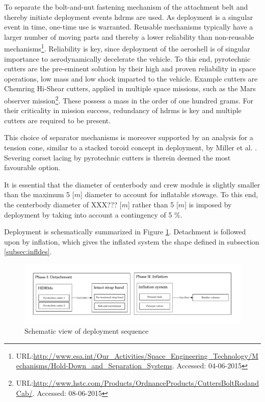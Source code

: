 To separate the bolt-and-nut fastening mechanism of the attachment belt and thereby initiate deployment events \glspl{hdrm} are used. As deployment is a singular event in time, one-time use is warranted. Reusable mechanisms typically have a larger number of moving parts and thereby a lower reliability than non-reusable mechanisms\footnote{URL:\url{http://www.esa.int/Our_Activities/Space_Engineering_Technology/Mechanisms/Hold-Down_and_Separation_Systems}. Accessed: 04-06-2015}. Reliability is key, since deployment of the aeroshell is of singular importance to aerodynamically decelerate the vehicle. To this end, pyrotechnic cutters are the pre-eminent solution by their high and proven reliability in space operations, low mass and low shock imparted to the vehicle. Example cutters are Chemring Hi-Shear cutters, applied in multiple space missions, such as the Mars observer mission\footnote{URL:\url{http://www.hstc.com/Products/OrdnanceProducts/CuttersBoltRodandCab/}. Accessed: 08-06-2015}. These possess a mass in the order of one hundred grams. For their criticality in mission success, redundancy of \glspl{hdrm} is key and multiple cutters are required to be present. 

This choice of separator mechanisms is moreover supported by an analysis for a tension cone, similar to a stacked toroid concept in deployment, by Miller et al. \cite{Miller2014}. Severing corset lacing by pyrotechnic cutters is therein deemed the most favourable option.

It is essential that the diameter of centerbody and crew module is slightly smaller than the maximum 5 [$m$] diameter to account for inflatable stowage. To this end, the centerbody diameter of XXX??? [$m$] rather than 5 [$m$] is imposed by deployment by taking into account a contingency of 5 $\%$.

Deployment is schematically summarized in Figure \ref{fig:deplflow}. Detachment is followed upon by inflation, which gives the inflated system the shape defined in subsection \ref{subsec:infldes}.

\begin{figure}[h]
		\centering
		\includegraphics[width=1.0\textwidth]{./Figure/Structure/Deployment.pdf}
		\caption{Schematic view of deployment sequence}
		\label{fig:deplflow}
\end{figure}






